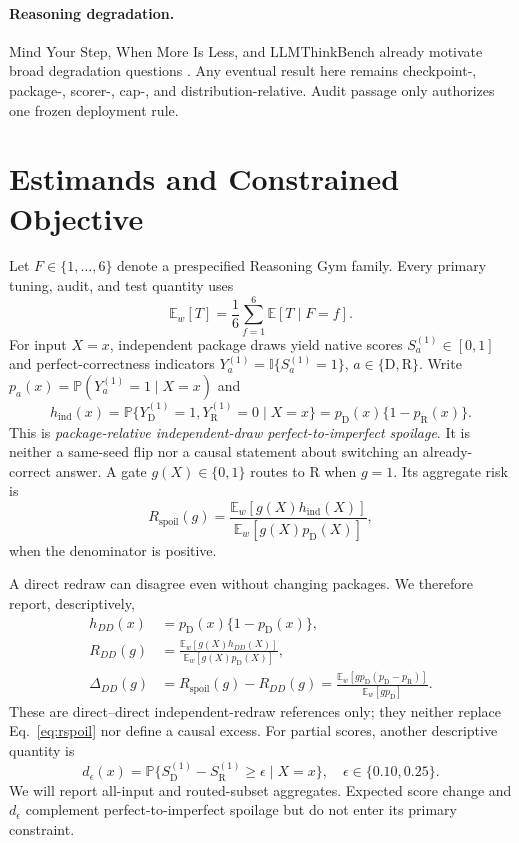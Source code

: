 \documentclass{article}
\newcommand{\D}{\ensuremath{\mathrm{D}}}
\newcommand{\Rpol}{\ensuremath{\mathrm{R}}}
\newcommand{\1}{\mathbb{I}}
\newcommand{\E}{\mathbb{E}}
\newcommand{\Ew}{\mathbb{E}_{w}}
\newcommand{\Prb}{\mathbb{P}}
\newcommand{\hInd}{h_{\mathrm{ind}}}
\newcommand{\Rspoil}{R_{\mathrm{spoil}}}
\begin{document}
\paragraph{Reasoning degradation.}
Mind Your Step, When More Is Less, and LLMThinkBench already motivate broad degradation questions \citep{pmlr-v267-liu25t,wu2026more,srivastava-etal-2026-llms}. Any eventual result here remains checkpoint-, package-, scorer-, cap-, and distribution-relative. Audit passage only authorizes one frozen deployment rule.

\section{Estimands and Constrained Objective}
Let $F\in\{1,\ldots,6\}$ denote a prespecified Reasoning Gym family. Every primary tuning, audit, and test quantity uses
\begin{equation}
 \Ew[T]=\frac{1}{6}\sum_{f=1}^{6}\E[T\mid F=f].
 \label{eq:ew}
\end{equation}
For input $X=x$, independent package draws yield native scores $S_a^{(1)}\in[0,1]$ and perfect-correctness indicators $Y_a^{(1)}=\1\{S_a^{(1)}=1\}$, $a\in\{\D,\Rpol\}$. Write $p_a(x)=\Prb(Y_a^{(1)}=1\mid X=x)$ and
\begin{equation}
 \hInd(x)=\Prb\{Y_\D^{(1)}=1,Y_\Rpol^{(1)}=0\mid X=x\}
 =p_\D(x)\{1-p_\Rpol(x)\}.
 \label{eq:hind}
\end{equation}
This is \emph{package-relative independent-draw perfect-to-imperfect spoilage}. It is neither a same-seed flip nor a causal statement about switching an already-correct answer. A gate $g(X)\in\{0,1\}$ routes to \Rpol{} when $g=1$. Its aggregate risk is
\begin{equation}
 \Rspoil(g)=\frac{\Ew[g(X)\hInd(X)]}{\Ew[g(X)p_\D(X)]},
 \label{eq:rspoil}
\end{equation}
when the denominator is positive.

A direct redraw can disagree even without changing packages. We therefore report, descriptively,
\begin{align}
 h_{DD}(x)&=p_\D(x)\{1-p_\D(x)\},\\
 R_{DD}(g)&=\frac{\Ew[g(X)h_{DD}(X)]}{\Ew[g(X)p_\D(X)]},\\
 \Delta_{DD}(g)&=\Rspoil(g)-R_{DD}(g)
 =\frac{\Ew[g p_\D(p_\D-p_\Rpol)]}{\Ew[g p_\D]}.
 \label{eq:hdd}
\end{align}
These are direct--direct independent-redraw references only; they neither replace Eq.~\ref{eq:rspoil} nor define a causal excess. For partial scores, another descriptive quantity is
\begin{equation}
 d_\epsilon(x)=\Prb\{S_\D^{(1)}-S_\Rpol^{(1)}\geq\epsilon\mid X=x\},
 \quad \epsilon\in\{0.10,0.25\}.
 \label{eq:degrade}
\end{equation}
We will report all-input and routed-subset aggregates. Expected score change and $d_\epsilon$ complement perfect-to-imperfect spoilage but do not enter its primary constraint.
\end{document}
